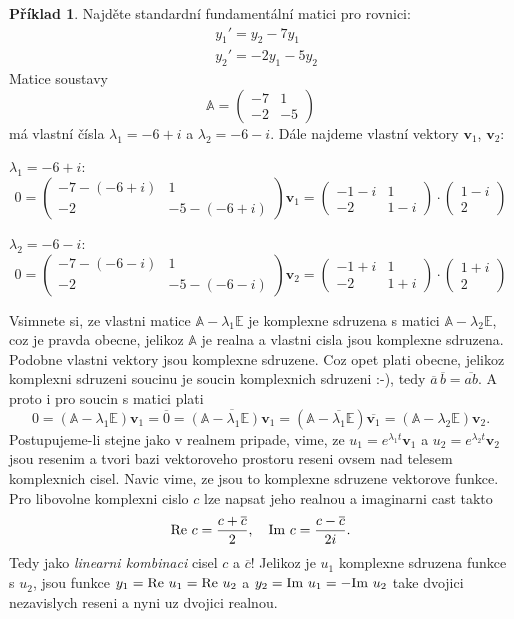\documentclass[a4paper, 12pt]{book}
\theoremstyle{definition}
\newtheorem{example}[theorem]{Příklad}
\def\vc#1{\mathbf{\boldsymbol{#1}}}     %
\def\tn#1{{\mathbb{#1}}}    %
\def\close#1{\overline{#1}}
\begin{document}
\begin{example}
Najděte standardní fundamentální matici pro rovnici:
 \begin{align*}
     &y_1'=y_2-7y_1\\
     &y_2'=-2y_1-5y_2
\end{align*}
Matice soustavy 
\[
  \tn A = \begin{pmatrix}-7&1\\-2&-5\end{pmatrix}
\]
má vlastní čísla $\lambda_1=-6+i$ a $\lambda_2=-6-i$. Dále najdeme vlastní vektory $\vc v_1$, $\vc v_2$:
\begin{description}
  \item $\lambda_1=-6+i$:
  \[
    0=\begin{pmatrix}-7-(-6+i)&1\\-2&-5-(-6+i)\end{pmatrix}\vc v_1
    =\begin{pmatrix}-1-i&1\\-2&1-i\end{pmatrix}\cdot 
     \begin{pmatrix}1-i\\2\end{pmatrix}
  \]
  \item $\lambda_2=-6-i$:
  \[
    0=\begin{pmatrix}-7-(-6-i)&1\\-2&-5-(-6-i)\end{pmatrix}\vc v_2
    =\begin{pmatrix}-1+i&1\\-2&1+i\end{pmatrix}\cdot 
     \begin{pmatrix}1+i\\2\end{pmatrix}
  \]
\end{description}

Vsimnete si, ze vlastni matice $\tn A-\lambda_1 \tn E$ je komplexne sdruzena s matici
$\tn A-\lambda_2 \tn E$, coz je pravda obecne, jelikoz $\tn A$ je realna a vlastni cisla jsou komplexne sdruzena.
Podobne vlastni vektory jsou komplexne sdruzene. Coz opet plati obecne, jelikoz komplexni sdruzeni
soucinu je soucin komplexnich sdruzeni :-), tedy $\close a\,\close b=\close{ab}$. A proto i 
pro soucin s matici plati
\[
  0=(\tn A-\lambda_1 \tn E)\vc v_1=\close{0}=\close{(\tn A-\lambda_1 \tn E)\vc v_1}
  =(\tn A-\close{\lambda_1} \tn E)\close{\vc v_1}=(\tn A-\lambda_2 \tn E)\vc v_2.
\]
Postupujeme-li stejne jako v realnem pripade, vime, ze $u_1=e^{\lambda_1 t}\vc v_1$ a $u_2=e^{\lambda_2 t}\vc v_2$
jsou resenim a tvori bazi vektoroveho prostoru reseni ovsem nad telesem komplexnich cisel.
Navic vime, ze jsou to komplexne sdruzene vektorove funkce. Pro libovolne komplexni cislo $c$
lze napsat jeho realnou a imaginarni cast takto
\[
  {\rm Re}\ c=\frac{c+\close{c}}{2},\quad{\rm Im}\ c=\frac{c-\close{c}}{2i}.
\]
Tedy jako {\it linearni kombinaci} cisel $c$ a $\close{c}$!
Jelikoz je $u_1$ komplexne sdruzena funkce s $u_2$, jsou funkce $y_1={\rm Re}\ u_1={\rm Re}\ u_2$ a 
$y_2={\rm Im}\ u_1=-{\rm Im}\ u_2$ take dvojici nezavislych reseni a nyni uz dvojici realnou.


\end{example}
\end{document}
